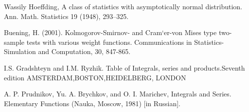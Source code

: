 \documentclass[final,11pt,3p]{elsarticle}
\begin{document}
 Wassily Hoeffding, A class of statistics with asymptotically normal distribution.
Ann. Math. Statistics 19 (1948), 293–325.

Buening, H. (2001). Kolmogorov-Smirnov- and Cram`er-von Mises type two-sample tests with various weight functions. Communications in Statistics-
Simulation and Computation, 30, 847-865.

I.S. Gradshteyn and I.M. Ryzhik. Table of Integrals, series and products.Seventh edition AMSTERDAM,BOSTON,HEIDELBERG, LONDON

A. P. Prudnikov, Yu. A. Brychkov, and O. I. Marichev, Integrals and Series. Elementary Functions (Nauka, Moscow, 1981) [in Russian].
\end{document}
